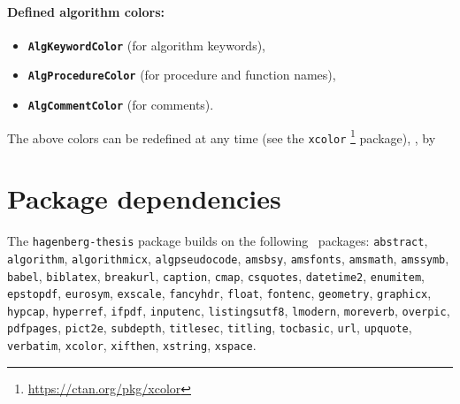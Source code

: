 \documentclass[english]{hgbarticle}
\begin{document}
\paragraph{Defined algorithm colors:}
\begin{itemize}
\item[] \textbf{\texttt{AlgKeywordColor}} (for algorithm keywords),
\item[] \textbf{\texttt{AlgProcedureColor}} (for procedure and function names),
\item[] \textbf{\texttt{AlgCommentColor}} (for comments).
\end{itemize}
The above colors can be redefined at any time (see the \texttt{xcolor}%
\footnote{\url{https://ctan.org/pkg/xcolor}} package), \eg, by
\begin{LaTeXCode}[numbers=none]
\end{LaTeXCode}


\section{Package dependencies}

\begin{sloppypar}
The \texttt{hagenberg-thesis} package builds on the following \latex\ packages:\newline
\texttt{abstract}, 
\texttt{algorithm}, 
\texttt{algorithmicx}, 
\texttt{algpseudocode}, 
\texttt{amsbsy}, 
\texttt{amsfonts}, 
\texttt{amsmath}, 
\texttt{amssymb}, 
\texttt{babel}, 
\texttt{biblatex}, 
\texttt{breakurl}, 
\texttt{caption}, 
\texttt{cmap}, 
\texttt{csquotes}, 
\texttt{datetime2}, 
\texttt{enumitem}, 
\texttt{epstopdf}, 
\texttt{eurosym}, 
\texttt{exscale}, 
\texttt{fancyhdr}, 
\texttt{float}, 
\texttt{fontenc}, 
\texttt{geometry}, 
\texttt{graphicx}, 
\texttt{hypcap}, 
\texttt{hyperref}, 
\texttt{ifpdf}, 
\texttt{inputenc}, 
\texttt{listingsutf8}, 
\texttt{lmodern}, 
\texttt{moreverb}, 
\texttt{overpic}, 
\texttt{pdfpages}, 
\texttt{pict2e}, 
\texttt{subdepth}, 
\texttt{titlesec}, 
\texttt{titling},
\texttt{tocbasic},
\texttt{url}, 
\texttt{upquote}, 
\texttt{verbatim}, 
\texttt{xcolor}, 
\texttt{xifthen},
\texttt{xstring},
\texttt{xspace}.
\end{sloppypar}
\end{document}
